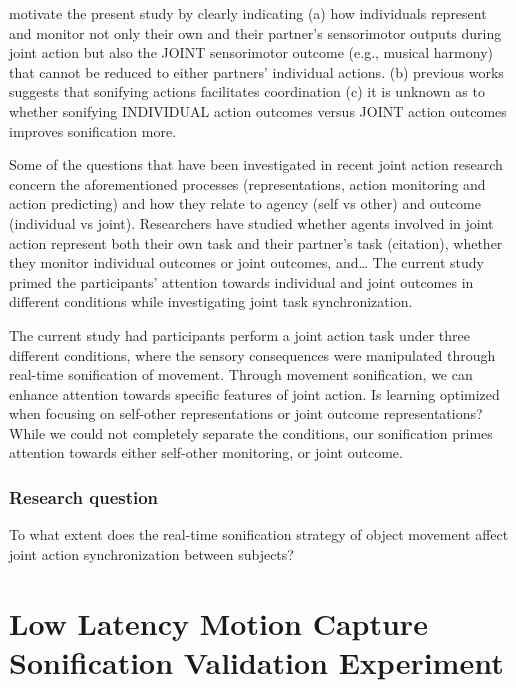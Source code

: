 \documentclass[10pt,a4paper,onecolumn]{article}
\begin{document}
motivate the present study by clearly indicating
(a) how individuals represent and monitor not only their own and their partner's sensorimotor outputs during joint action but also the JOINT sensorimotor outcome (e.g., musical harmony) that cannot be reduced to either partners' individual actions.
(b) previous works suggests that sonifying actions facilitates coordination
(c) it is unknown as to whether sonifying INDIVIDUAL action outcomes versus JOINT action outcomes improves sonification more.

Some of the questions that have been investigated in recent joint action research concern the aforementioned processes (representations, action monitoring and action predicting) and how they relate to agency (self vs other) and outcome (individual vs joint). Researchers have studied whether agents involved in joint action represent both their own task and their partner's task (citation), whether they monitor individual outcomes or joint outcomes, and\ldots{} The current study primed the participants' attention towards individual and joint outcomes in different conditions while investigating joint task synchronization.

The current study had participants perform a joint action task under three different conditions, where the sensory consequences were manipulated through real-time sonification of movement.
Through movement sonification, we can enhance attention towards specific features of joint action. Is learning optimized when focusing on self-other representations or joint outcome representations?
While we could not completely separate the conditions, our sonification primes attention towards either self-other monitoring, or joint outcome.

\hypertarget{research-question}{%
\subsubsection{Research question}\label{research-question}}

To what extent does the real-time sonification strategy of object movement affect joint action synchronization between subjects?

\hypertarget{low-latency-motion-capture-sonification-validation-experiment}{%
\section{Low Latency Motion Capture Sonification Validation Experiment}\label{low-latency-motion-capture-sonification-validation-experiment}}
\end{document}
